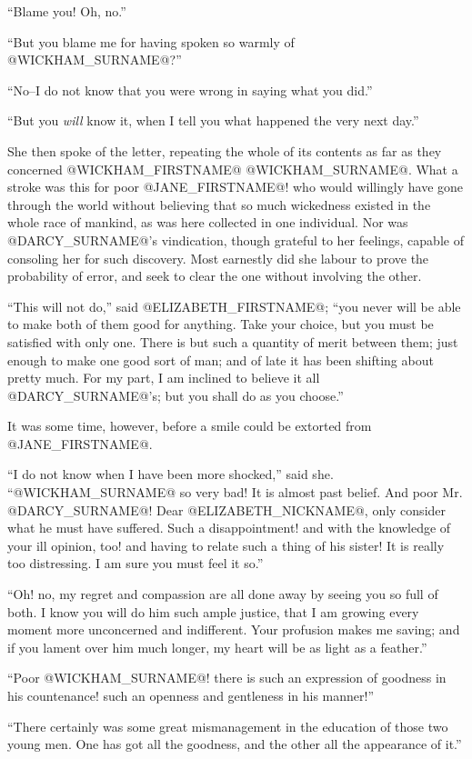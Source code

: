 ``Blame you! Oh, no.''

``But you blame me for having spoken so warmly of @WICKHAM_SURNAME@?''

``No--I do not know that you were wrong in saying what you did.''

``But you \textit{will} know it, when I tell you what happened the very next
day.''

She then spoke of the letter, repeating the whole of its contents as far
as they concerned @WICKHAM_FIRSTNAME@ @WICKHAM_SURNAME@. What a stroke was this for poor @JANE_FIRSTNAME@!
who would willingly have gone through the world without believing that
so much wickedness existed in the whole race of mankind, as was here
collected in one individual. Nor was @DARCY_SURNAME@'s vindication, though
grateful to her feelings, capable of consoling her for such discovery.
Most earnestly did she labour to prove the probability of error, and
seek to clear the one without involving the other.

``This will not do,'' said @ELIZABETH_FIRSTNAME@; ``you never will be able to make both
of them good for anything. Take your choice, but you must be satisfied
with only one. There is but such a quantity of merit between them; just
enough to make one good sort of man; and of late it has been shifting
about pretty much. For my part, I am inclined to believe it all @DARCY_SURNAME@'s;
but you shall do as you choose.''

It was some time, however, before a smile could be extorted from @JANE_FIRSTNAME@.

``I do not know when I have been more shocked,'' said she. ``@WICKHAM_SURNAME@ so
very bad! It is almost past belief. And poor Mr. @DARCY_SURNAME@! Dear @ELIZABETH_NICKNAME@, only
consider what he must have suffered. Such a disappointment! and with the
knowledge of your ill opinion, too! and having to relate such a thing
of his sister! It is really too distressing. I am sure you must feel it
so.''

``Oh! no, my regret and compassion are all done away by seeing you so
full of both. I know you will do him such ample justice, that I am
growing every moment more unconcerned and indifferent. Your profusion
makes me saving; and if you lament over him much longer, my heart will
be as light as a feather.''

``Poor @WICKHAM_SURNAME@! there is such an expression of goodness in his
countenance! such an openness and gentleness in his manner!''

``There certainly was some great mismanagement in the education of those
two young men. One has got all the goodness, and the other all the
appearance of it.''


